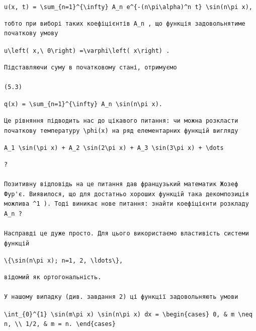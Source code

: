 \documentclass[
  ukrainian,
]{article}
\begin{document}
\texttt{u(x,\ t)\ =\ \textbackslash{}sum\_\{n=1\}\^{}\{\textbackslash{}infty\}\ A\_n\ e\^{}\{-(n\textbackslash{}pi\textbackslash{}alpha)\^{}n\ t\}\ \textbackslash{}sin(n\textbackslash{}pi\ x),}

\begin{verbatim}
тобто при виборі таких коефіцієнтів A_n , що функція задовольнятиме початкову умову
\end{verbatim}

\texttt{u\textbackslash{}left(\ x,\textbackslash{}\ 0\textbackslash{}right)\ =\textbackslash{}varphi\textbackslash{}left(\ x\textbackslash{}right)\ .}

\begin{verbatim}
Підставляючи суму в початковому стані, отримуємо

(5.3)
\end{verbatim}

\texttt{q(x)\ =\ \textbackslash{}sum\_\{n=1\}\^{}\{\textbackslash{}infty\}\ A\_n\ \textbackslash{}sin(n\textbackslash{}pi\ x).}

\begin{verbatim}
Це рівняння підводить нас до цікавого питання: чи можна розкласти початкову температуру \phi(x) на ряд елементарних функцій вигляду
\end{verbatim}

\texttt{A\_1\ \textbackslash{}sin(\textbackslash{}pi\ x)\ +\ A\_2\ \textbackslash{}sin(2\textbackslash{}pi\ x)\ +\ A\_3\ \textbackslash{}sin(3\textbackslash{}pi\ x)\ +\ \textbackslash{}dots}

\begin{verbatim}
?

Позитивну відповідь на це питання дав французький математик Жозеф Фур'є. Виявилося, що для достатньо хороших функцій така декомпозиція можлива ^1 ). Тоді виникає нове питання: знайти коефіцієнти розкладу A_n ?

Насправді це дуже просто. Для цього використаємо властивість системи функцій
\end{verbatim}

\texttt{\textbackslash{}\{\textbackslash{}sin(n\textbackslash{}pi\ x);\ n=1,\ 2,\ \textbackslash{}ldots\textbackslash{}\},}

\begin{verbatim}
відомий як ортогональність.

У нашому випадку (див. завдання 2) ці функції задовольняють умови
\end{verbatim}

\texttt{\textbackslash{}int\_\{0\}\^{}\{1\}\ \textbackslash{}sin(m\textbackslash{}pi\ x)\ \textbackslash{}sin(n\textbackslash{}pi\ x)\ dx\ =\ \textbackslash{}begin\{cases\}\ 0,\ \&\ m\ \textbackslash{}neq\ n,\ \textbackslash{}\textbackslash{}\ 1/2,\ \&\ m\ =\ n.\ \textbackslash{}end\{cases\}}
\end{document}
